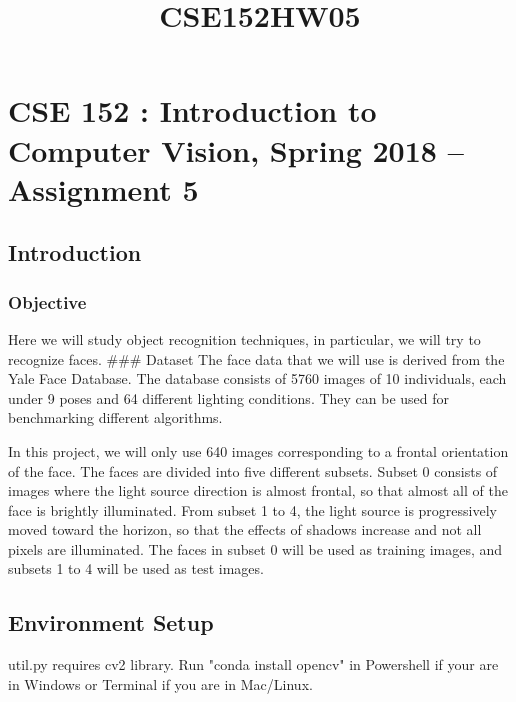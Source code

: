 \documentclass[11pt]{article}
\title{CSE152HW05}
\begin{document}
    
    
    \maketitle
    
    

    
    \section{CSE 152 : Introduction to Computer Vision, Spring 2018 --
Assignment
5}\label{cse-152-introduction-to-computer-vision-spring-2018-assignment-5}

    \subsection{Introduction}\label{introduction}

\subsubsection{Objective}\label{objective}

Here we will study object recognition techniques, in particular, we will
try to recognize faces. \#\#\# Dataset The face data that we will use is
derived from the Yale Face Database. The database consists of 5760
images of 10 individuals, each under 9 poses and 64 different lighting
conditions. They can be used for benchmarking different algorithms.

In this project, we will only use 640 images corresponding to a frontal
orientation of the face. The faces are divided into five different
subsets. Subset 0 consists of images where the light source direction is
almost frontal, so that almost all of the face is brightly illuminated.
From subset 1 to 4, the light source is progressively moved toward the
horizon, so that the effects of shadows increase and not all pixels are
illuminated. The faces in subset 0 will be used as training images, and
subsets 1 to 4 will be used as test images.

    \subsection{Environment Setup}\label{environment-setup}

util.py requires cv2 library. Run "conda install opencv" in Powershell
if your are in Windows or Terminal if you are in Mac/Linux.
\end{document}
